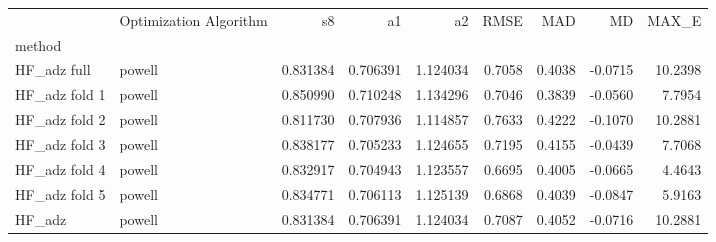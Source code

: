 \begin{tabular}{llrrrrrrr}
 & Optimization Algorithm & s8 & a1 & a2 & RMSE & MAD & MD & MAX_E \\
method &  &  &  &  &  &  &  &  \\
HF_adz full & powell & 0.831384 & 0.706391 & 1.124034 & 0.7058 & 0.4038 & -0.0715 & 10.2398 \\
HF_adz fold 1 & powell & 0.850990 & 0.710248 & 1.134296 & 0.7046 & 0.3839 & -0.0560 & 7.7954 \\
HF_adz fold 2 & powell & 0.811730 & 0.707936 & 1.114857 & 0.7633 & 0.4222 & -0.1070 & 10.2881 \\
HF_adz fold 3 & powell & 0.838177 & 0.705233 & 1.124655 & 0.7195 & 0.4155 & -0.0439 & 7.7068 \\
HF_adz fold 4 & powell & 0.832917 & 0.704943 & 1.123557 & 0.6695 & 0.4005 & -0.0665 & 4.4643 \\
HF_adz fold 5 & powell & 0.834771 & 0.706113 & 1.125139 & 0.6868 & 0.4039 & -0.0847 & 5.9163 \\
HF_adz & powell & 0.831384 & 0.706391 & 1.124034 & 0.7087 & 0.4052 & -0.0716 & 10.2881 \\
\end{tabular}
